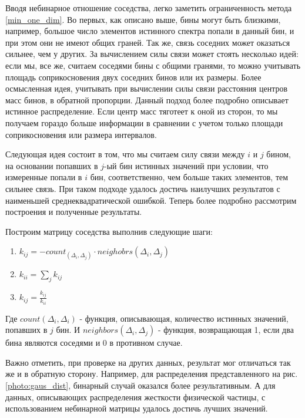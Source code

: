 \documentclass[a4paper,12pt]{diplom}
\begin{document}
Вводя небинарное отношение соседства, легко заметить ограниченность метода \eqref{min_one_dim}. Во первых, как описано выше, бины могут 
быть близкими, например, большое число элементов истинного спектра попали в данный бин, и при этом они не имеют общих граней. Так же, 
связь соседних может оказаться сильнее, чем у других. За вычислением силы связи может стоять несколько идей: если мы, все же, 
считаем соседями бины с общими гранями, то можно учитывать площадь соприкосновения двух соседних бинов или их размеры. 
Более осмысленная идея, учитывать при вычислении силы связи расстояния центров масс бинов, в обратной пропорции. 
Данный подход более подробно описывает истинное распределение. Если центр масс 
тяготеет к оной из сторон, то мы получаем гораздо больше информации в сравнении с учетом только площади соприкосновения или размера интервалов. 

Следующая идея состоит в том, что мы считаем силу связи между $i$ и $j$ бином, на основании попавших в $j$-ый бин истинных значений при условии,
что измеренные попали в $i$ бин, соответственно, чем больше таких элементов, тем сильнее связь. При таком подходе удалось достичь наилучших 
результатов с наименьшей среднеквадратической ошибкой. Теперь более подробно рассмотрим построения и полученные результаты.

Построим матрицу соседства выполнив следующие шаги:

\begin{enumerate}
   \item  $k_{ij} = - count_(\Delta_{i}, \Delta_{j}) \cdot neighobrs(\Delta_{i}, \Delta_{j})$ \\

   \item  $k_{ii} = \displaystyle\sum_{j} k_{ij}$ \\

   \item  $k_{ij} = \frac{k_{ij}}{k_{ii}}$

\end{enumerate}

Где $count(\Delta_{i}, \Delta_{i})$ - функция, описывающая, количество истинных значений, попавших в $j$ бин. 
И $neighbors(\Delta_{i}, \Delta_{j})$ - функция, возвращающая 1, если два бина являются соседями и 0 в противном случае.

Важно отметить, при проверке на других данных, результат мог отличаться так же и в обратную сторону. Например, для распределения
представленного на рис. \ref{photo:gaus_dist}, бинарный случай оказался более результативным. А для данных, описывающих распределения жесткости
физической частицы, с использованием небинарной матрицы удалось достичь лучших значений.
\end{document}
